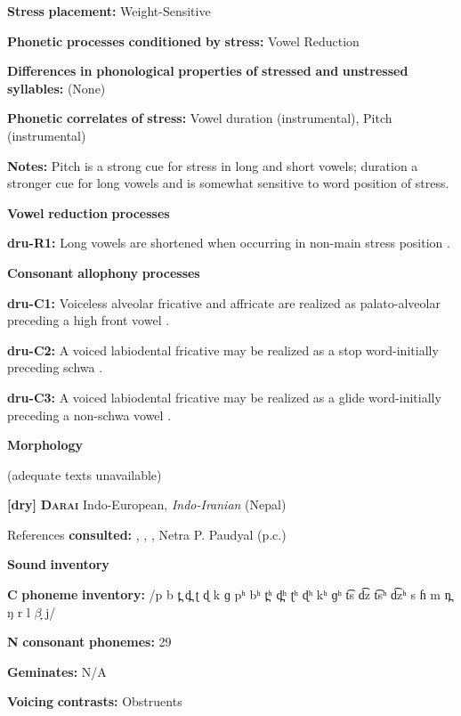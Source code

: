 \begin{styleBody}
\textbf{Stress} \textbf{placement:} Weight-Sensitive

\textbf{Phonetic} \textbf{processes} \textbf{conditioned} \textbf{by} \textbf{stress:} Vowel Reduction

\textbf{Differences} \textbf{in} \textbf{phonological} \textbf{properties} \textbf{of} \textbf{stressed} \textbf{and} \textbf{unstressed} \textbf{syllables:} (None)

\textbf{Phonetic} \textbf{correlates} \textbf{of} \textbf{stress:} Vowel duration (instrumental), Pitch (instrumental)

\textbf{Notes:} Pitch is a strong cue for stress in long and short vowels; duration a stronger cue for long vowels and is somewhat sensitive to word position of stress.

\textbf{Vowel} \textbf{reduction} \textbf{processes}

\textbf{dru-R1:} Long vowels are shortened when occurring in non-main stress position \citep[257]{Chen2006}.

\textbf{Consonant} \textbf{allophony} \textbf{processes}

\textbf{dru-C1:} Voiceless alveolar fricative and affricate are realized as palato-alveolar preceding a high front vowel \citep[230]{Chen2006}.

\textbf{dru-C2:} A voiced labiodental fricative may be realized as a stop word-initially preceding schwa \citep[227]{Chen2006}.

\textbf{dru-C3:} A voiced labiodental fricative may be realized as a glide word-initially preceding a non-schwa vowel \citep[227]{Chen2006}.

\textbf{Morphology}

(adequate texts unavailable)

\textbf{[dry]}   \textbf{\textsc{Darai}}    Indo-European, \textit{Indo-Iranian} (Nepal)

References \textbf{consulted:} \citet{Dhakal2012}, \citet{KotapishKotapish1973}, \citet{Paudyal2003}, Netra P. Paudyal (p.c.)

\textbf{Sound} \textbf{inventory}

\textbf{C} \textbf{phoneme} \textbf{inventory:} /p b t̪ d̪ ʈ ɖ k ɡ pʰ bʰ t̪ʰ d̪ʰ ʈʰ ɖʰ kʰ ɡʰ t͡s d͡z t͡sʰ d͡zʰ s ɦ m n̪ ŋ r l $\beta ̞$ j/

\textbf{N} \textbf{consonant} \textbf{phonemes:} 29

\textbf{Geminates:} N/A

\textbf{Voicing} \textbf{contrasts:} Obstruents


\end{styleBody}
